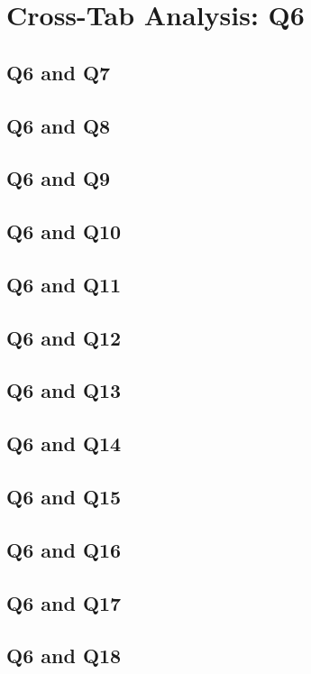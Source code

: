 \documentclass{report}
\begin{document}
\chapter{Cross-Tab Analysis: Q6}

\section{Q6 and Q7}\clearpage
\section{Q6 and Q8}\clearpage
\section{Q6 and Q9}\clearpage
\section{Q6 and Q10}\clearpage
\section{Q6 and Q11}\clearpage
\section{Q6 and Q12}\clearpage
\section{Q6 and Q13}\clearpage
\section{Q6 and Q14}\clearpage
\section{Q6 and Q15}\clearpage
\section{Q6 and Q16}\clearpage
\section{Q6 and Q17}\clearpage
\section{Q6 and Q18}\clearpage
\end{document}
